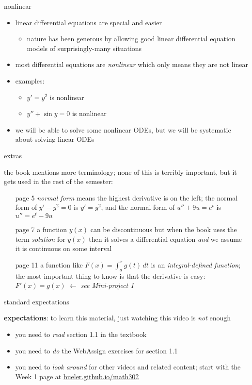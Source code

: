 \documentclass{beamer}
\begin{document}
\begin{frame}{nonlinear}

\begin{itemize}
\item linear differential equations are special and easier
    \begin{itemize}
    \item nature has been generous by allowing good linear differential equation models of surprisingly-many situations
    \end{itemize}
\item most differential equations are \emph{nonlinear} which only means they are not linear
\item examples:
    \begin{itemize}
    \item $y' = y^2$ is nonlinear
    \item $y'' + \sin y =0$ is nonlinear
    \end{itemize}
\item we will be able to solve some nonlinear ODEs, but we will be systematic about solving linear ODEs
\end{itemize}
\end{frame}

\begin{frame}{extras}

the book mentions more terminology; none of this is terribly important, but it gets used in the rest of the semester:
\begin{itemize}
\item[page 5] \emph{normal form} means the highest derivative is on the left; the normal form of $y' - y^2=0$ is $y'=y^2$, and the normal form of $u''+9u=e^t$ is $u'' = e^t - 9u$
\item[page 7] a function $y(x)$ can be discontinuous but when the book uses the term \emph{solution} for $y(x)$ then it solves a differential equation \emph{and} we assume it is continuous on some interval
\item[page 11] a function like $F(x) = \int_a^x g(t)\,dt$ is an \emph{integral-defined function}; the most important thing to know is that the derivative is easy: $F'(x)=g(x)$ \hfill $\longleftarrow$ \emph{see Mini-project 1}
\end{itemize}
\end{frame}

\begin{frame}{standard expectations}

\textbf{expectations}:  to learn this material, just watching this video is \emph{not} enough
\begin{itemize}
\item you need to \emph{read} section 1.1 in the textbook
\item you need to \emph{do} the WebAssign exercises for section 1.1
\item you need to \emph{look around} for other videos and related content; start with the Week 1 page at \href{https://bueler.github.io/math302/}{bueler.github.io/math302}
\end{itemize}
\end{frame}
\end{document}
